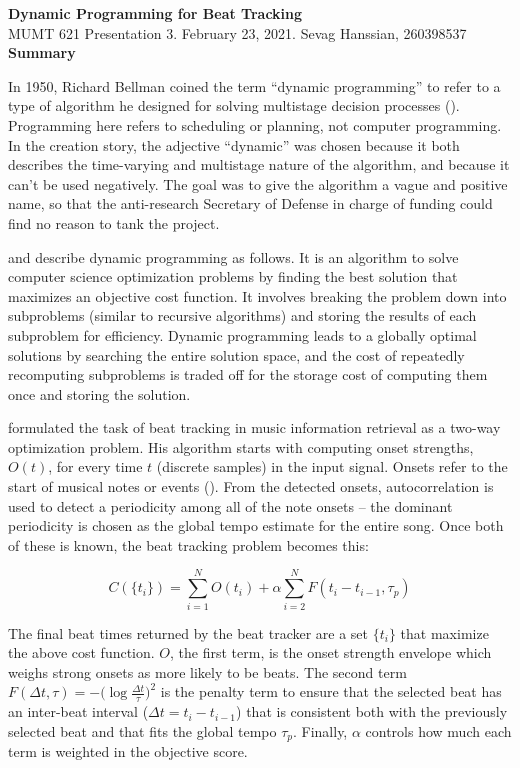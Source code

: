 \documentclass[letter,11pt]{report}
\begin{document}
\noindent\LARGE{\textbf{Dynamic Programming for Beat Tracking}}\\
\large{MUMT 621 Presentation 3. February 23, 2021. Sevag Hanssian, 260398537}\\

\noindent\Large{\textbf{Summary}}

In 1950, Richard Bellman coined the term ``dynamic programming'' to refer to a type of algorithm he designed for solving multistage decision processes (\cite{bellmanhistory}). Programming here refers to scheduling or planning, not computer programming. In the creation story, the adjective ``dynamic'' was chosen because it both describes the time-varying and multistage nature of the algorithm, and because it can't be used negatively. The goal was to give the algorithm a vague and positive name, so that the anti-research Secretary of Defense in charge of funding could find no reason to tank the project.

\textcite{skiena} and \textcite{clrs} describe dynamic programming as follows. It is an algorithm to solve computer science optimization problems by finding the best solution that maximizes an objective cost function. It involves breaking the problem down into subproblems (similar to recursive algorithms) and storing the results of each subproblem for efficiency. Dynamic programming leads to a globally optimal solutions by searching the entire solution space, and the cost of repeatedly recomputing subproblems is traded off for the storage cost of computing them once and storing the solution.

\textcite{ellis} formulated the task of beat tracking in music information retrieval as a two-way optimization problem. His algorithm starts with computing onset strengths, $O(t)$, for every time $t$ (discrete samples) in the input signal. Onsets refer to the start of musical notes or events (\cite{onsets}). From the detected onsets, autocorrelation is used to detect a periodicity among all of the note onsets -- the dominant periodicity is chosen as the global tempo estimate for the entire song. Once both of these is known, the beat tracking problem becomes this:

\[ C(\{t_{i}\}) = \sum_{i=1}^{N}O(t_{i}) + \alpha\sum_{i=2}^{N}F(t_{i}-t_{i-1}, \tau_{p}) \]

The final beat times returned by the beat tracker are a set $\{t_{i}\}$ that maximize the above cost function. $O$, the first term, is the onset strength envelope which weighs strong onsets as more likely to be beats. The second term $F(\Delta t, \tau) = -\Big(\log\frac{\Delta t}{\tau}\Big)^{2}$ is the penalty term to ensure that the selected beat has an inter-beat interval ($\Delta t = t_{i}-t_{i-1}$) that is consistent both with the previously selected beat and that fits the global tempo $\tau_{p}$. Finally, $\alpha$ controls how much each term is weighted in the objective score.
\end{document}
